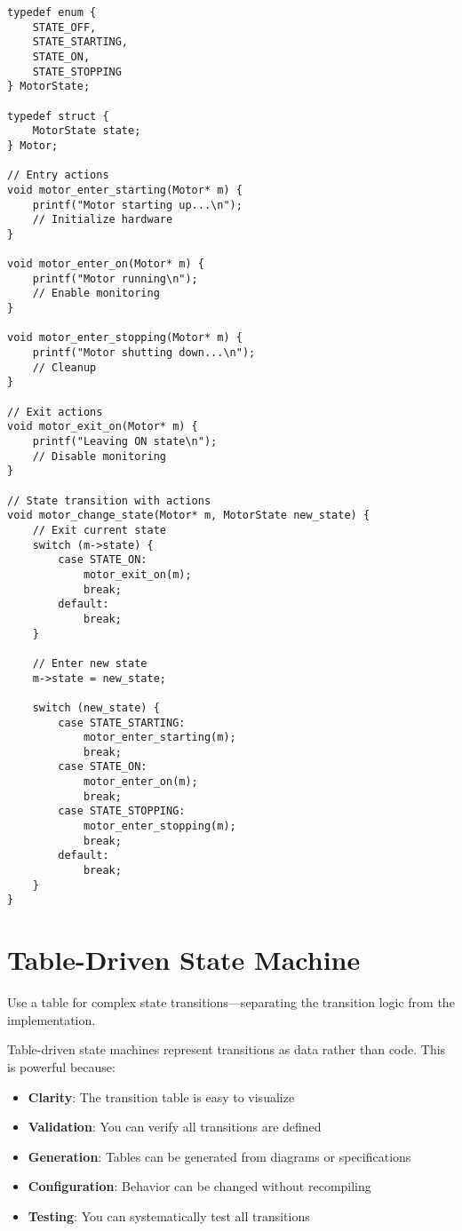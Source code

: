 \begin{lstlisting}
typedef enum {
    STATE_OFF,
    STATE_STARTING,
    STATE_ON,
    STATE_STOPPING
} MotorState;

typedef struct {
    MotorState state;
} Motor;

// Entry actions
void motor_enter_starting(Motor* m) {
    printf("Motor starting up...\n");
    // Initialize hardware
}

void motor_enter_on(Motor* m) {
    printf("Motor running\n");
    // Enable monitoring
}

void motor_enter_stopping(Motor* m) {
    printf("Motor shutting down...\n");
    // Cleanup
}

// Exit actions
void motor_exit_on(Motor* m) {
    printf("Leaving ON state\n");
    // Disable monitoring
}

// State transition with actions
void motor_change_state(Motor* m, MotorState new_state) {
    // Exit current state
    switch (m->state) {
        case STATE_ON:
            motor_exit_on(m);
            break;
        default:
            break;
    }

    // Enter new state
    m->state = new_state;

    switch (new_state) {
        case STATE_STARTING:
            motor_enter_starting(m);
            break;
        case STATE_ON:
            motor_enter_on(m);
            break;
        case STATE_STOPPING:
            motor_enter_stopping(m);
            break;
        default:
            break;
    }
}
\end{lstlisting}

\section{Table-Driven State Machine}

Use a table for complex state transitions---separating the transition logic from the implementation.

Table-driven state machines represent transitions as data rather than code. This is powerful because:

\begin{itemize}
    \item \textbf{Clarity}: The transition table is easy to visualize
    \item \textbf{Validation}: You can verify all transitions are defined
    \item \textbf{Generation}: Tables can be generated from diagrams or specifications
    \item \textbf{Configuration}: Behavior can be changed without recompiling
    \item \textbf{Testing}: You can systematically test all transitions
\end{itemize}

